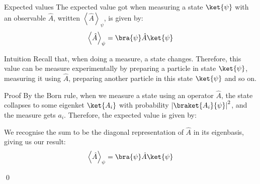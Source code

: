 \documentclass[a4paper]{article}
\begin{document}
\begin{parag}{Expected values}
    The expected value got when measuring a state $\ket{\psi}$ with an observable $\hat{A}$, written $\left\langle \hat{A} \right\rangle_{\psi}$, is given by: 
    \[\left\langle \hat{A} \right\rangle_{\psi} = \bra{\psi} \hat{A} \ket{\psi}\]
    
    \begin{subparag}{Intuition}
        Recall that, when doing a measure, a state changes. Therefore, this value can be measure experimentally by preparing a particle in state $\ket{\psi}$, measuring it using $\hat{A}$, preparing another particle in this state $\ket{\psi}$ and so on.
    \end{subparag}

    \begin{subparag}{Proof}
        By the Born rule, when we measure a state using an operator $\hat{A}$, the state collapses to some eigenket $\ket{A_i}$ with probability $\left|\braket{A_i}{\psi}\right|^2$, and the measure gets $a_i$. Therefore, the expected value is given by: 
        
        We recognise the sum to be the diagonal representation of $\hat{A}$ in its eigenbasis, giving us our result: 
        \[\left\langle \hat{A} \right\rangle_{\psi} = \bra{\psi} \hat{A} \ket{\psi}\]

        \qed
    \end{subparag}
\end{parag}
\end{document}
